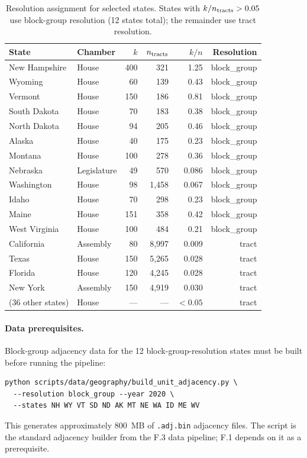 \begin{table}[h]
\centering\small
\begin{tabular}{llrrrr}
\toprule
State & Chamber & $k$ & $n_{\rm tracts}$ & $k/n$ & Resolution \\
\midrule
New Hampshire & House & 400 & 321 & 1.25 & block\_group \\
Wyoming       & House & 60  & 139 & 0.43 & block\_group \\
Vermont       & House & 150 & 186 & 0.81 & block\_group \\
South Dakota  & House & 70  & 183 & 0.38 & block\_group \\
North Dakota  & House & 94  & 205 & 0.46 & block\_group \\
Alaska        & House & 40  & 175 & 0.23 & block\_group \\
Montana       & House & 100 & 278 & 0.36 & block\_group \\
Nebraska      & Legislature & 49 & 570 & 0.086 & block\_group \\
Washington    & House & 98  & 1{,}458 & 0.067 & block\_group \\
Idaho         & House & 70  & 298 & 0.23 & block\_group \\
Maine         & House & 151 & 358 & 0.42 & block\_group \\
West Virginia & House & 100 & 484 & 0.21 & block\_group \\
\midrule
California    & Assembly & 80  & 8{,}997 & 0.009 & tract \\
Texas         & House & 150 & 5{,}265 & 0.028 & tract \\
Florida       & House & 120 & 4{,}245 & 0.028 & tract \\
New York      & Assembly & 150 & 4{,}919 & 0.030 & tract \\
(36 other states) & House & --- & --- & $<0.05$ & tract \\
\bottomrule
\end{tabular}
\caption{Resolution assignment for selected states. States with
  $k/n_{\rm tracts} > 0.05$ use block-group resolution (12 states total);
  the remainder use tract resolution.}
\label{tab:resolution-assignment}
\end{table}

\paragraph{Data prerequisites.}
Block-group adjacency data for the 12 block-group-resolution states must
be built before running the pipeline:
\begin{verbatim}
python scripts/data/geography/build_unit_adjacency.py \
  --resolution block_group --year 2020 \
  --states NH WY VT SD ND AK MT NE WA ID ME WV
\end{verbatim}
This generates approximately 800~MB of \texttt{.adj.bin} adjacency files.
The script is the standard adjacency builder from the F.3 data pipeline;
F.1 depends on it as a prerequisite.

